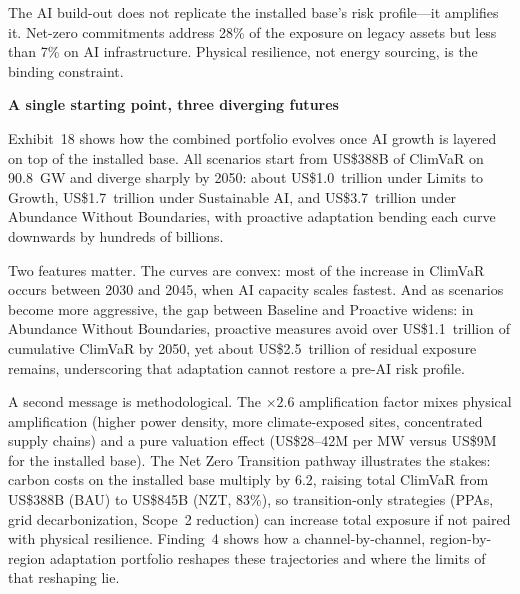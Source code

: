 \begin{pullquote}
The AI build-out does not replicate the installed base's risk profile---it amplifies it. Net-zero commitments address 28\% of the exposure on legacy assets but less than 7\% on AI infrastructure. Physical resilience, not energy sourcing, is the binding constraint.
\end{pullquote}

\begin{twocolbody}

{\color{SEGreen}\textbf{A single starting point, three diverging futures}}

\vspace{1mm}

\noindent Exhibit~18 shows how the combined portfolio evolves once AI growth is layered on top of the installed base. All scenarios start from US\$388B of ClimVaR on 90.8~GW and diverge sharply by 2050: about US\$1.0~trillion under Limits to Growth, US\$1.7~trillion under Sustainable AI, and US\$3.7~trillion under Abundance Without Boundaries, with proactive adaptation bending each curve downwards by hundreds of billions.

Two features matter. The curves are convex: most of the increase in ClimVaR occurs between 2030 and 2045, when AI capacity scales fastest. And as scenarios become more aggressive, the gap between Baseline and Proactive widens: in Abundance Without Boundaries, proactive measures avoid over US\$1.1~trillion of cumulative ClimVaR by 2050, yet about US\$2.5~trillion of residual exposure remains, underscoring that adaptation cannot restore a pre-AI risk profile.

A second message is methodological. The \(\times 2.6\) amplification factor mixes physical amplification (higher power density, more climate-exposed sites, concentrated supply chains) and a pure valuation effect (US\$28--42M per MW versus US\$9M for the installed base). The Net Zero Transition pathway illustrates the stakes: carbon costs on the installed base multiply by 6.2, raising total ClimVaR from US\$388B (BAU) to US\$845B (NZT, 83\%), so transition-only strategies (PPAs, grid decarbonization, Scope~2 reduction) can increase total exposure if not paired with physical resilience. Finding~4 shows how a channel-by-channel, region-by-region adaptation portfolio reshapes these trajectories and where the limits of that reshaping lie.

\end{twocolbody}


